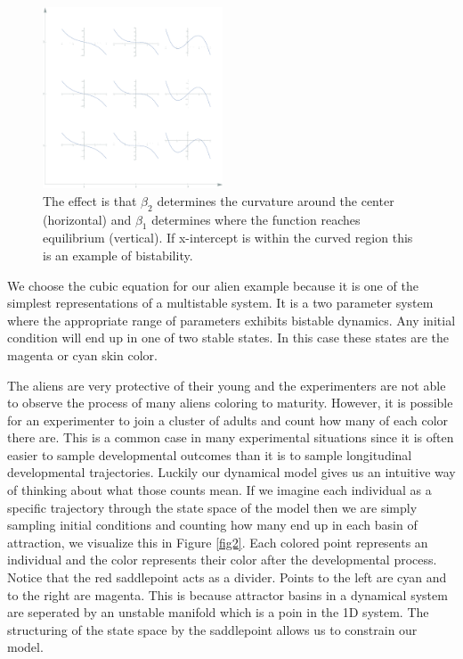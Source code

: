 \documentclass[letterpaper]{article}
\begin{document}
\begin{figure}[t]
\begin{center}
\includegraphics[width=2.1in,angle=0]{./cubic_params.png}
\caption{The effect is that $\beta_2$ determines the curvature around the 
center (horizontal)
and $\beta_1$ determines where the function reaches equilibrium (vertical).
If x-intercept is within the curved region this is an example of bistability.}
\label{fig1}
\end{center}
\end{figure}

We choose the cubic equation for our alien example because it is one of the 
simplest representations of a multistable system. It is a 
two parameter system where the appropriate range of parameters exhibits bistable
dynamics. Any initial condition will end up in one of two stable states. In this
case these states are the magenta or cyan skin color.

The aliens are very protective of their young and the experimenters are not able
to observe the process of many aliens coloring to maturity. However,
it is possible for an experimenter to join a cluster of adults and count
how many of each color there are. This is a common case in many experimental 
situations since it is often
easier to sample developmental outcomes than it is to sample longitudinal developmental
trajectories. Luckily our dynamical model gives us an intuitive way of thinking about
what those counts mean. If we imagine each individual as a specific trajectory through
the state space of the model then we are simply sampling initial conditions and counting
how many end up in each basin of attraction, we visualize this in Figure \ref{fig2}. Each
colored point represents an individual and the color represents their color after
the developmental process. Notice that the red saddlepoint acts as a divider. Points to
the left are cyan and to the right are magenta. This is because attractor basins in a 
dynamical system are seperated by an unstable manifold which is a poin in the 1D system.
The structuring of the state space by the saddlepoint allows us to constrain our model.
\end{document}
